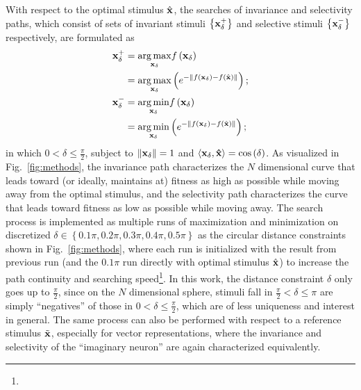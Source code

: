 \documentclass[10pt,twocolumn,letterpaper]{article}
\begin{document}
With respect to the optimal stimulus $\hat{\bf{x}}$, the searches of invariance and selectivity paths, which consist of sets of invariant stimuli $\left\lbrace \bf{x}^{+}_{\delta} \right\rbrace$ and selective stimuli $\left\lbrace \bf{x}^{-}_{\delta} \right\rbrace$ respectively, are formulated as
\begin{align}
\bf{x}^{+}_{\delta} &= \underset{\bf{x}_{\delta}}{\arg\max} f\left(\bf{x}_{\delta}\right) \label{eq:I1} \\
&= \underset{\bf{x}_{\delta}}{\arg\max} \left( e^{-\left\|f\left(\bf{x}_{\delta}\right)-f\left(\hat{\bf{x}}\right)\right\|} \right); \label{eq:I2} \\
\bf{x}^{-}_{\delta} &= \underset{\bf{x}_{\delta}}{\arg\min} f\left(\bf{x}_{\delta}\right) \label{eq:S1} \\
&= \underset{\bf{x}_{\delta}}{\arg\min} \left( e^{-\left\|f\left(\bf{x}_{\delta}\right)-f\left(\hat{\bf{x}}\right)\right\|} \right); \label{eq:S2}
\end{align}
in which $0 < \delta \le \frac{\pi}{2}$, subject to $\left\| \bf{x}_{\delta} \right\| = 1$ and $\langle \bf{x}_{\delta} , \hat{\bf{x}} \rangle = \cos\left(\delta\right)$. 
As visualized in Fig.~\ref{fig:methods}, the invariance path characterizes the $N$ dimensional curve that leads toward (or ideally, maintains at) fitness as high as possible while moving away from the optimal stimulus, and the selectivity path characterizes the curve that leads toward fitness as low as possible while moving away.
The search process is implemented as multiple runs of maximization and minimization on discretized $\delta \in \left\lbrace 0.1\pi, 0.2\pi, 0.3\pi, 0.4\pi, 0.5\pi\right\rbrace$ as the circular distance constraints shown in Fig.~\ref{fig:methods}, where each run is initialized with the result from previous run (and the $0.1\pi$ run directly with optimal stimulus $\hat{\bf{x}}$) to increase the path continuity and searching speed\footnote{\expdiff}.
In this work, the distance constraint $\delta$ only goes up to $\frac{\pi}{2}$, since on the $N$ dimensional sphere, stimuli fall in $\frac{\pi}{2} < \delta \le \pi$ are simply ``negatives'' of those in $0 < \delta \le \frac{\pi}{2}$, which are of less uniqueness and interest in general. 
The same process can also be performed with respect to a reference stimulus $\tilde{\bf{x}}$, especially for vector representations, where the invariance and selectivity of the ``imaginary neuron'' are again characterized equivalently.

\end{document}
